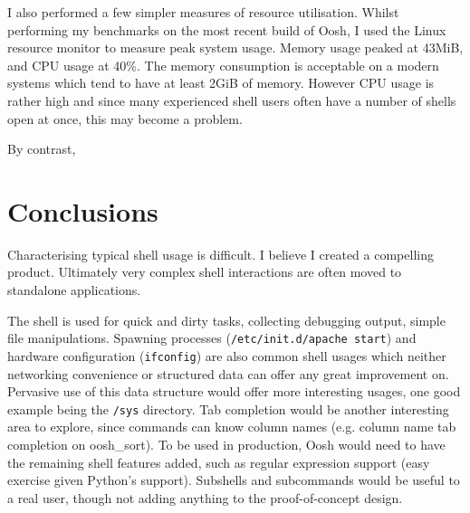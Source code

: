 \documentclass[12pt,twoside,notitlepage]{report}
\begin{document}
I also performed a few simpler measures of resource
utilisation. Whilst performing my benchmarks on the most recent build
of Oosh, I used the Linux resource monitor to measure peak system
usage. Memory usage peaked at 43MiB, and CPU usage at 40\%. The memory
consumption is acceptable on a modern systems which tend to have at
least 2GiB of memory. However CPU usage is rather high and since many
experienced shell users often have a number of shells open at once,
this may become a problem.

By contrast, %


\cleardoublepage
\chapter{Conclusions}


Characterising typical shell usage is difficult. I believe I created a
compelling product. Ultimately very complex shell interactions are often moved
to standalone applications. %

The shell is used for quick and dirty tasks, collecting debugging output, simple
file manipulations. Spawning processes ({\tt /etc/init.d/apache start}) and
hardware configuration ({\tt ifconfig}) are also common shell usages which
neither networking convenience or structured data can offer any great
improvement on. Pervasive use of this data structure would offer more
interesting usages, one good example being the {\tt /sys} directory. Tab
completion would be another interesting area to explore, since commands can know
column names (e.g. column name tab completion on oosh\_sort). To be used in
production, Oosh would need to have the remaining shell features added, such as
regular expression support (easy exercise given Python's support). Subshells and
subcommands would be useful to a real user, though not adding anything to the
proof-of-concept design.
\end{document}
